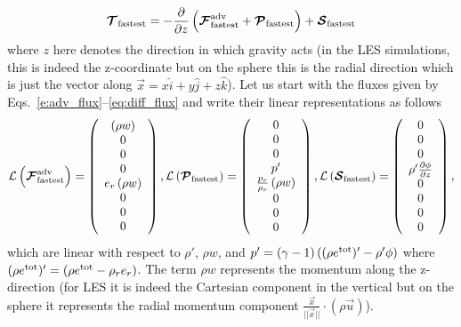 \documentclass{article}
\begin{document}
\[
 \boldsymbol{{\mathcal{T}}}_{\mathrm{fastest}}=- \frac{\partial }{\partial z} \left( \boldsymbol{{\mathcal{F}}}^{\mathrm{adv}}_{\mathrm{fastest}} + \boldsymbol{{\mathcal{P}}}_{\mathrm{fastest}} \right) + \boldsymbol{{\mathcal{S}}}_{\mathrm{fastest}}
 \]
 where $z$ here denotes the direction in which gravity acts (in the LES simulations, this is indeed the z-coordinate but on the sphere this is the radial direction which is just the vector along $\vec{x}=x \hat{i} + y \hat{j} + z \hat{k}$).  Let us start with the fluxes given by Eqs.\ \eqref{e:adv_flux}--\eqref{eq:diff_flux} and write their linear representations as follows
 \begin{equation}
 \mathcal{L} \left( \boldsymbol{{\mathcal{F}}}^{\mathrm{adv}}_{\mathrm{fastest}} \right)=\left( \begin{array}{c}
 \left( \rho w \right) \\
 0 \\
 0 \\
 0 \\
 e_r \left( \rho w \right) \\
0 \\
0 \\
0
\end{array}
\right), 
\mathcal{L} \left( \boldsymbol{{\mathcal{P}}}_{\mathrm{fastest}} \right) = \left( \begin{array}{c}
0 \\
0 \\
0 \\
p' \\
\frac{p_r}{\rho_r} \left( \rho w \right) \\
0 \\
0 \\
0 
\end{array}
\right),
\mathcal{L} \left( \boldsymbol{{\mathcal{S}}}_{\mathrm{fastest}} \right) = \left( \begin{array}{c}
0 \\
0 \\
0 \\
\rho' \frac{\partial \phi}{\partial z} \\
0 \\
0 \\
0 \\
0 
\end{array}
\right),
\label{eq:fluxes_linear_1d}
\end{equation}
which are linear with respect to $\rho'$, $\rho w$, and 
$p'=(\gamma-1)\left((\rho e^{\mathrm{tot}})' - \rho' \phi\right)$ where
$(\rho e^{\mathrm{tot}})'=(\rho e^{\mathrm{tot}} - \rho_r e_r)$.  The term $\rho w$ represents the momentum along the z-direction (for LES it is indeed the Cartesian component in the vertical but on the sphere it represents the radial momentum component $\frac{\vec{x}}{||\vec{x}||} \cdot \left(\rho \vec{u}\right)$).
\end{document}
